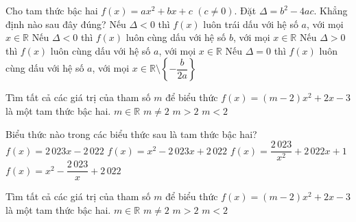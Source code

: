 

\begin{ex}%
	Cho tam thức bậc hai $f(x)=a x^2+b x+c$  $(c \neq 0)$. Đặt $\Delta=b^2-4a c$. Khẳng định nào sau đây đúng?
	\choice 
		{Nếu $\Delta < 0$ thì $f(x)$ luôn trái dấu  với hệ số $a$, với mọi $x \in \mathbb{R}$}
		{Nếu $\Delta < 0$  thì $f(x)$ luôn cùng dấu với hệ số $b$, với mọi $x \in \mathbb{R}$}
		{Nếu  $\Delta > 0$ thì $f(x)$ luôn cùng dấu với hệ số $a$, với mọi $x \in \mathbb{R}$}
		{\True Nếu $\Delta=0$ thì $f(x)$ luôn cùng dấu với hệ số $a$, với mọi $x \in  \mathbb{R} \setminus\left\{-\dfrac{b}{2a}\right\}$}
\end{ex}

\begin{ex}%
	Tìm tất cả các giá trị của tham số $m$ để biểu thức $f(x)=(m-2)x^2+2x-3$ là một tam thức bậc  hai.
	\choice 
		{$m\in \mathbb{R}$} 
		{\True $m\ne  2$}
		{$m  > 2$}
		{$m <  2$}
\end{ex}

\begin{ex}%
	Biểu thức nào trong các  biểu thức sau là tam thức bậc hai?
	 \choice
		{$f(x)=2\,023x-2\,022$} 
		{\True  $f(x)=x^2-2\,023x+2\,022$}
		 {$f(x)=\dfrac{2\,023}{x^2}+2\,022x+1$}
		{$f(x)=x^2-\dfrac{2\,023}{x}+2\,022$} 
\end{ex}

\begin{ex}%
	Tìm tất cả  các giá trị của tham số $m$ để biểu thức $f(x)=\left(m-2\right)x^2+2x-3$ là một tam thức bậc hai.
	\choice 
		{$m\in \mathbb{R}$} 
		{\True $m\ne  2$}
		{$m > 2$} 
		 {$m < 2$}
\end{ex}

